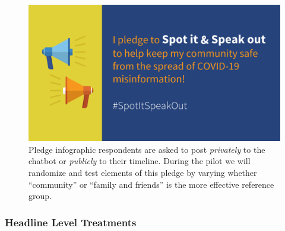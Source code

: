 \documentclass[letterpaper, 12pt, parskip=full,]{scrartcl}
\begin{document}
\begin{enumerate}
\begin{figure}[htb]
\centering
\includegraphics[width=.5\textwidth]{figures/pledge_image.png}
\caption{Pledge infographic respondents are asked to post \textit{privately} to the chatbot or \textit{publicly} to their timeline. During the pilot we will randomize and test elements of this pledge by varying whether ``community'' or ``family and friends'' is the more effective reference group.}
\end{figure}
\end{enumerate}


\subsubsection{Headline Level Treatments}
\end{document}
